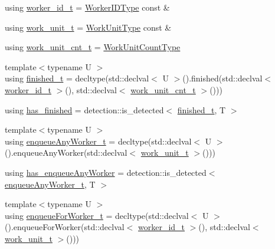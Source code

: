 \begin{DoxyCompactItemize}
\item 
using \hyperlink{structvt_1_1worker_1_1_worker_group_traits_a227b8add8f3fae6004adc05d5e85204f}{worker\+\_\+id\+\_\+t} = \hyperlink{namespacevt_a656e362091da17b9b93d0655b36e3392}{Worker\+I\+D\+Type} const  \&
\item 
using \hyperlink{structvt_1_1worker_1_1_worker_group_traits_ae7c108d04180f59f3e2cd4fa065be4b0}{work\+\_\+unit\+\_\+t} = \hyperlink{namespacevt_1_1worker_a59d2fcdafa81fc0af7f921a258e42202}{Work\+Unit\+Type} const  \&
\item 
using \hyperlink{structvt_1_1worker_1_1_worker_group_traits_af8719962bd8fc468206bb7a0de8e29be}{work\+\_\+unit\+\_\+cnt\+\_\+t} = \hyperlink{namespacevt_1_1worker_a8080c49350b0520151601a8b24d6c6cf}{Work\+Unit\+Count\+Type}
\item 
{\footnotesize template$<$typename U $>$ }\\using \hyperlink{structvt_1_1worker_1_1_worker_group_traits_a6553b883b8acf8e1f1eb3ee24534d093}{finished\+\_\+t} = decltype(std\+::declval$<$ U $>$().finished(std\+::declval$<$ \hyperlink{structvt_1_1worker_1_1_worker_group_traits_a227b8add8f3fae6004adc05d5e85204f}{worker\+\_\+id\+\_\+t} $>$(), std\+::declval$<$ \hyperlink{structvt_1_1worker_1_1_worker_group_traits_af8719962bd8fc468206bb7a0de8e29be}{work\+\_\+unit\+\_\+cnt\+\_\+t} $>$()))
\item 
using \hyperlink{structvt_1_1worker_1_1_worker_group_traits_a7f0610934ac19a57667b48a2af1d42f1}{has\+\_\+finished} = detection\+::is\+\_\+detected$<$ \hyperlink{structvt_1_1worker_1_1_worker_group_traits_a6553b883b8acf8e1f1eb3ee24534d093}{finished\+\_\+t}, T $>$
\item 
{\footnotesize template$<$typename U $>$ }\\using \hyperlink{structvt_1_1worker_1_1_worker_group_traits_a2eaad9ce43633046cc98b466dc1088ac}{enqueue\+Any\+Worker\+\_\+t} = decltype(std\+::declval$<$ U $>$().enqueue\+Any\+Worker(std\+::declval$<$ \hyperlink{structvt_1_1worker_1_1_worker_group_traits_ae7c108d04180f59f3e2cd4fa065be4b0}{work\+\_\+unit\+\_\+t} $>$()))
\item 
using \hyperlink{structvt_1_1worker_1_1_worker_group_traits_aab410614bd95041609fc12566b34d407}{has\+\_\+enqueue\+Any\+Worker} = detection\+::is\+\_\+detected$<$ \hyperlink{structvt_1_1worker_1_1_worker_group_traits_a2eaad9ce43633046cc98b466dc1088ac}{enqueue\+Any\+Worker\+\_\+t}, T $>$
\item 
{\footnotesize template$<$typename U $>$ }\\using \hyperlink{structvt_1_1worker_1_1_worker_group_traits_abc65803c8886a88507e51c0798fe38a7}{enqueue\+For\+Worker\+\_\+t} = decltype(std\+::declval$<$ U $>$().enqueue\+For\+Worker(std\+::declval$<$ \hyperlink{structvt_1_1worker_1_1_worker_group_traits_a227b8add8f3fae6004adc05d5e85204f}{worker\+\_\+id\+\_\+t} $>$(), std\+::declval$<$ \hyperlink{structvt_1_1worker_1_1_worker_group_traits_ae7c108d04180f59f3e2cd4fa065be4b0}{work\+\_\+unit\+\_\+t} $>$()))

\end{DoxyCompactItemize}
